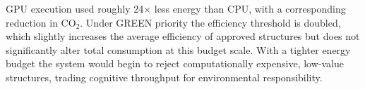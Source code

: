 GPU execution used roughly 24$\times$ less energy than CPU, with a
corresponding reduction in CO$_2$.  Under GREEN priority the efficiency
threshold is doubled, which slightly increases the average efficiency of
approved structures but does not significantly alter total consumption at
this budget scale.  With a tighter energy budget the system would begin to
reject computationally expensive, low‑value structures, trading cognitive
throughput for environmental responsibility.